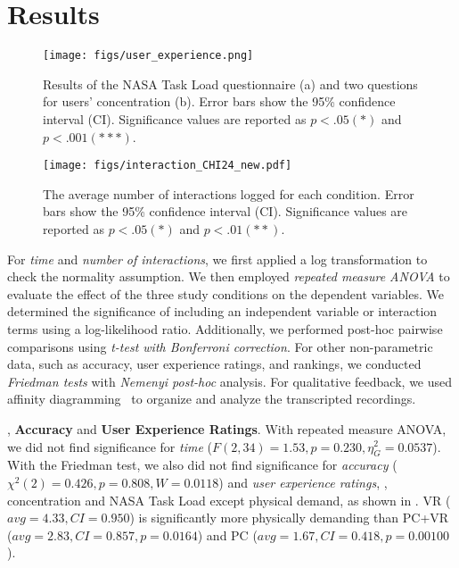 \section{Results}
\label{sec:result}

\begin{figure*}
\centering
\texttt{[image: figs/user\_experience.png]}
\caption{Results of the NASA Task Load questionnaire (a) and two questions for users' concentration (b). Error bars show the 95\% confidence interval (CI).
Significance values are reported as $p {<} .05(*)$ and $p {<} .001({*}{*}*)$. }
\label{fig:user_experience}
\end{figure*}

\begin{figure*}
\centering
\texttt{[image: figs/interaction\_CHI24\_new.pdf]}
\caption{The average number of interactions logged for each condition. Error bars show the 95\% confidence interval (CI). 
Significance values are reported as $p {<} .05(*)$ and $p {<} .01(**)$. }
\label{fig:interaction_result}
\end{figure*}

For \textit{time} and \textit{number of interactions}, we first applied a log transformation to check the normality assumption. We then employed \textit{repeated measure ANOVA} to evaluate the effect of the three study conditions on the dependent variables. 
We determined the significance of including an independent variable or interaction terms using a log-likelihood ratio.
Additionally, we performed post-hoc pairwise comparisons using \textit{t-test with Bonferroni correction}.
For other non-parametric data, such as accuracy, user experience ratings, and rankings, we conducted \textit{Friedman tests} with \textit{Nemenyi post-hoc} analysis.
For qualitative feedback, we used affinity diagramming~\cite{hartson2012ux} to organize and analyze the transcripted recordings.

, \textbf{Accuracy} and \textbf{User Experience Ratings}.
With repeated measure ANOVA, we did not find significance for \textit{time} ($F(2,34){=}1.53, p{=}0.230, \eta^2_G{=}0.0537$).
With the Friedman test, we also did not find significance for \textit{accuracy} ($\chi^2(2){=}0.426,p{=}0.808,W{=}0.0118$) and \textit{user experience ratings}, \ie, concentration and NASA Task Load except physical demand, as shown in . VR ($avg{=}4.33, CI{=}0.950$) is significantly more physically demanding than PC+VR ($avg{=}2.83, CI{=}0.857, p{=}0.0164$) and PC ($avg{=}1.67, CI{=}0.418, p{=}0.00100$).

